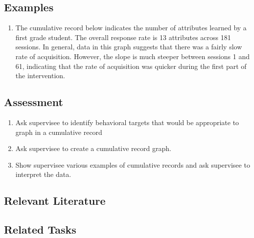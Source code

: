 \subsection{Examples}
\begin{enumerate}
\item The cumulative record below indicates the number of attributes learned by a first grade student.  The overall response rate is 13 attributes across 181 sessions.  In general, data in this graph suggests that there was a fairly slow rate of acquisition. However, the slope is much steeper between sessions 1 and 61, indicating that the rate of acquisition was quicker during the first part of the intervention. 
\end{enumerate}
%
\subsection{Assessment}
\begin{enumerate}
\item Ask supervisee to identify behavioral targets that would be appropriate to graph in a cumulative record
\item Ask supervisee to create a cumulative record graph.
\item Show supervisee various examples of cumulative records and ask supervisee to interpret the data.
\end{enumerate}
%
\subsection{Relevant Literature}
\begin{refsection}
\nocite{test,alang2017police,clayton2018black}
\printbibliography[heading=none]
\end{refsection}
% 
\subsection{Related Tasks}
\fouraTen{}\\
\fourhOne{}\\
\fourhTwo{}\\
\fourhThree{}\\
\fourhFour{}\\
\fourhFive{}\\
%
%
%
%
%
